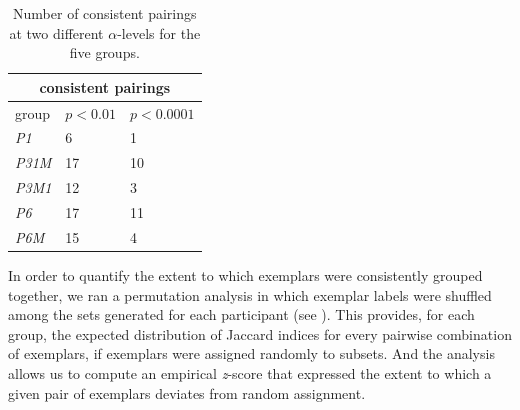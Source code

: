 \documentclass[11pt, twoside]{article}
\providecommand{\DIFaddbegin}{} %
\providecommand{\DIFaddend}{} %
\providecommand{\DIFdelbegin}{} %
\providecommand{\DIFdelend}{} %
\providecommand{\DIFaddbeginFL}{} %
\providecommand{\DIFaddendFL}{} %
\providecommand{\DIFdelbeginFL}{} %
\providecommand{\DIFdelendFL}{} %
\newcommand{\DIFscaledelfig}{0.5}
\newlength{\DIFdelgraphicswidth} %
\newlength{\DIFdelgraphicsheight} %
\newcommand{\DIFaddincludegraphics}[2][]{{\color{blue}\fbox{\DIFOincludegraphics[#1]{#2}}}} %
\newcommand{\DIFdelincludegraphics}[2][]{%
\sbox{\DIFdelgraphicsbox}{\DIFOincludegraphics[#1]{#2}}%
\settoboxwidth{\DIFdelgraphicswidth}{\DIFdelgraphicsbox} %
\settoboxtotalheight{\DIFdelgraphicsheight}{\DIFdelgraphicsbox} %
\scalebox{\DIFscaledelfig}{%
\parbox[b]{\DIFdelgraphicswidth}{\usebox{\DIFdelgraphicsbox}\\[-\baselineskip] \rule{\DIFdelgraphicswidth}{0em}}\llap{\resizebox{\DIFdelgraphicswidth}{\DIFdelgraphicsheight}{%
\setlength{\unitlength}{\DIFdelgraphicswidth}%
\begin{picture}(1,1)%
\thicklines\linethickness{2pt} %
{\color[rgb]{1,0,0}\put(0,0){\framebox(1,1){}}}%
{\color[rgb]{1,0,0}\put(0,0){\line( 1,1){1}}}%
{\color[rgb]{1,0,0}\put(0,1){\line(1,-1){1}}}%
\end{picture}%
}\hspace*{3pt}}} %
} %
\DeclareRobustCommand{\DIFaddbegin}{\DIFOaddbegin \let\includegraphics\DIFaddincludegraphics} %
\DeclareRobustCommand{\DIFaddend}{\DIFOaddend \let\includegraphics\DIFOincludegraphics} %
\DeclareRobustCommand{\DIFdelbegin}{\DIFOdelbegin \let\includegraphics\DIFdelincludegraphics} %
\DeclareRobustCommand{\DIFdelend}{\DIFOaddend \let\includegraphics\DIFOincludegraphics} %
\DeclareRobustCommand{\DIFaddbeginFL}{\DIFOaddbeginFL \let\includegraphics\DIFaddincludegraphics} %
\DeclareRobustCommand{\DIFaddendFL}{\DIFOaddendFL \let\includegraphics\DIFOincludegraphics} %
\DeclareRobustCommand{\DIFdelbeginFL}{\DIFOdelbeginFL \let\includegraphics\DIFdelincludegraphics} %
\DeclareRobustCommand{\DIFdelendFL}{\DIFOaddendFL \let\includegraphics\DIFOincludegraphics} %
\begin{document}
\DIFdelbegin %
\DIFdelend \DIFaddbegin \begin{table}[H]
	\DIFaddendFL \centering
	\begin{tabular}[t]{ |p{2cm}||p{2cm}|p{2cm}| }
		\hline
		\multicolumn{3}{|c|}{consistent pairings} \\
		\hline
		group & $p<0.01$ & $p<0.0001$ \\
		\hline
		\textit{P1}   & 6  & 1  \\
		\textit{P31M} & 17 & 10 \\
		\textit{P3M1} & 12 & 3  \\
		\textit{P6}   & 17 & 11 \\
		\textit{P6M}  & 15 & 4  \\
		\hline
	\end{tabular}
	\caption{Number of consistent pairings at two different $\alpha$-levels for the five groups.  }
	\label{table:pairings}
\DIFdelbeginFL %
\DIFdelendFL \DIFaddbeginFL \end{table}

\DIFaddend 

In order to quantify the extent to which exemplars were consistently grouped together, we ran a permutation analysis in which exemplar labels were shuffled among the sets generated for each participant (see ). This provides, for each group, the expected distribution of Jaccard indices for every pairwise combination of exemplars, if exemplars were assigned randomly to subsets. And the analysis allows us to compute an empirical \textit{z}-score that expressed the extent to which a given pair of exemplars deviates from random assignment. 
\end{document}
